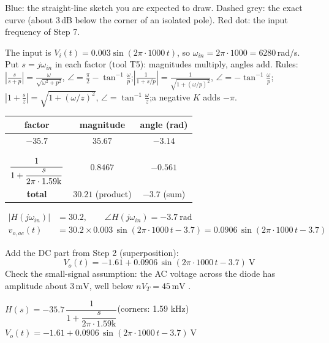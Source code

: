 \documentclass[11pt]{article}
\newcommand{\solstep}[2]{\par\medskip{\color{stepc}\textbf{Step #1 --- #2}}\par\nopagebreak}
\begin{document}
{\small Blue: the straight-line sketch you are expected to draw. Dashed grey: the exact curve (about 3\,dB below the corner of an isolated pole). Red dot: the input frequency of Step 7.}
\solstep{7}{Total output (DC + AC)}The input is $V_i(t) = 0.003\sin\left(2\pi\cdot 1000\,t\right)$, so $\omega_{in} = 2\pi\cdot 1000 = 6280$\,rad/s. Put $s=j\omega_{in}$ in each factor (tool T5): magnitudes multiply, angles add.
{\small Rules: $\left|\frac{s}{s+p}\right| = \frac{\omega}{\sqrt{\omega^2+p^2}}$, $\angle = \frac{\pi}{2}-\tan^{-1}\frac{\omega}{p}$;\quad $\left|\frac{1}{1+s/p}\right| = \frac{1}{\sqrt{1+(\omega/p)^2}}$, $\angle = -\tan^{-1}\frac{\omega}{p}$;\quad $\left|1+\frac{s}{z}\right| = \sqrt{1+(\omega/z)^2}$, $\angle = \tan^{-1}\frac{\omega}{z}$;\quad a negative $K$ adds $-\pi$.}
\begin{center}\renewcommand{\arraystretch}{1.35}
\begin{tabular}{ccc}
\toprule
factor & magnitude & angle (rad) \\
\midrule
$-35.7$ & $35.67$ & $-3.14$ \\
$\rule[-1.7em]{0pt}{4em}\dfrac{1}{1+\dfrac{s}{2\pi\cdot 1.59\mathrm{k}}}$ & $0.8467$ & $-0.561$ \\
\textbf{total} & $\mathbf{30.21}$ (product) & $\mathbf{-3.7}$ (sum) \\
\bottomrule
\end{tabular}\end{center}

\begin{align*}
|H(j\omega_{in})| &= 30.2, \qquad \angle H(j\omega_{in}) = -3.7\ \mathrm{rad} \\
v_{o,ac}(t) &= 30.2\times 0.003\,\sin\left(2\pi\cdot 1000\,t - 3.7\right) = 0.0906\,\sin\left(2\pi\cdot 1000\,t - 3.7\right)
\end{align*}

Add the DC part from Step 2 (superposition):
\[
\boxed{V_o(t) = -1.61 + 0.0906\,\sin\left(2\pi\cdot 1000\,t - 3.7\right)\ \mathrm{V}}
\]
 Check the small-signal assumption: the AC voltage across the diode has amplitude about $3\,\mathrm{m}\mathrm{V}$, well below $nV_T = 45\,\mathrm{m}\mathrm{V}$ \checkmark.
\begin{ansbox}
$H(s) = -35.7\,\dfrac{1}{1+\dfrac{s}{2\pi\cdot 1.59\mathrm{k}}}$\quad (corners: 1.59 kHz)\\[4pt]
$V_o(t) = -1.61 + 0.0906\,\sin\left(2\pi\cdot 1000\,t - 3.7\right)\ \mathrm{V}$
\end{ansbox}

\newpage
\end{document}
